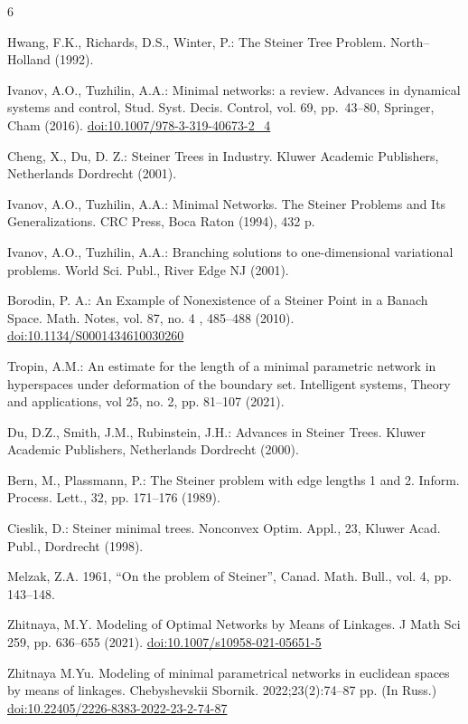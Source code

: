 \documentclass{svproc}
\begin{document}
%
%
\begin{thebibliography}{6}
%

 Hwang, F.K., Richards, D.S., Winter, P.: The Steiner Tree Problem. North--Holland (1992).

 Ivanov, A.O., Tuzhilin, A.A.: Minimal networks: a review. Advances in dynamical systems and control, Stud. Syst. Decis. Control, vol. 69, pp.~43--80, Springer, Cham (2016).
\url{doi:10.1007/978-3-319-40673-2_4}

 Cheng, X., Du, D. Z.: Steiner Trees in Industry. Kluwer Academic Publishers, Netherlands Dordrecht (2001).

 Ivanov, A.O., Tuzhilin, A.A.: Minimal Networks. The Steiner Problems and Its Generalizations. CRC Press, Boca Raton (1994), 432 p.

 Ivanov, A.O., Tuzhilin, A.A.: Branching solutions to one-dimensional variational problems. World Sci. Publ., River Edge NJ (2001).

 Borodin, P. A.: An Example of Nonexistence of a Steiner Point in a Banach Space. Math. Notes, vol. 87, no. 4 , 485--488 (2010).
\url{doi:10.1134/S0001434610030260}

 Tropin, A.M.: An estimate for the length of a minimal parametric network in hyperspaces under deformation of the boundary set. Intelligent systems, Theory and applications, vol 25, no. 2,  pp. 81--107 (2021).

 Du, D.Z., Smith, J.M., Rubinstein, J.H.: Advances in Steiner Trees. Kluwer Academic Publishers, Netherlands Dordrecht (2000).

 Bern, M., Plassmann, P.: The Steiner problem with edge lengths 1 and 2. Inform. Process. Lett., 32, pp. 171--176 (1989).

 Cieslik, D.: Steiner minimal trees. Nonconvex Optim. Appl., 23, Kluwer Acad. Publ., Dordrecht (1998).

 Melzak, Z.A. 1961, “On the problem of Steiner”, Canad. Math. Bull., vol. 4, pp. 143--148.

 Zhitnaya, M.Y. Modeling of Optimal Networks by Means of Linkages. J Math Sci 259, pp. 636--655 (2021).
\url{doi:10.1007/s10958-021-05651-5}

 Zhitnaya M.Yu. Modeling of minimal parametrical networks in euclidean spaces by means of linkages. Chebyshevskii Sbornik. 2022;23(2):74--87 pp. (In Russ.) 
\url{doi:10.22405/2226-8383-2022-23-2-74-87}


\end{thebibliography}
\end{document}
